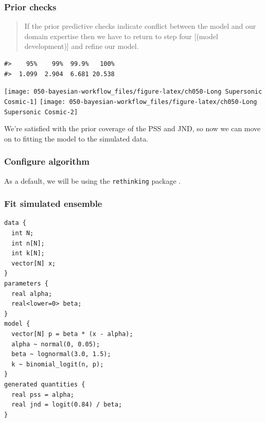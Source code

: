 \documentclass[11pt, oneside, openany]{scrbook}
\begin{document}

\hypertarget{prior-checks}{%
\subsubsection{Prior checks}\label{prior-checks}}

\begin{quote}
If the prior predictive checks indicate conflict between the model and our domain expertise then we have to return to step four {[}(model development){]} and refine our model.
\end{quote}

\begin{verbatim}
#>    95%    99%  99.9%   100% 
#>  1.099  2.904  6.681 20.538
\end{verbatim}

\begin{center}\texttt{[image: 050-bayesian-workflow\_files/figure-latex/ch050-Long Supersonic Cosmic-1]} \texttt{[image: 050-bayesian-workflow\_files/figure-latex/ch050-Long Supersonic Cosmic-2]} \end{center}

We're satisfied with the prior coverage of the PSS and JND, so now we can move on to fitting the model to the simulated data.

\hypertarget{configure-algorithm}{%
\subsubsection{Configure algorithm}\label{configure-algorithm}}

As a default, we will be using the \texttt{rethinking} package \citep{rethinking}.

\hypertarget{fit-simulated-ensemble}{%
\subsubsection{Fit simulated ensemble}\label{fit-simulated-ensemble}}


\begin{verbatim}
data {
  int N;
  int n[N];
  int k[N];
  vector[N] x;
}
parameters {
  real alpha;
  real<lower=0> beta;
}
model {
  vector[N] p = beta * (x - alpha);
  alpha ~ normal(0, 0.05);
  beta ~ lognormal(3.0, 1.5);
  k ~ binomial_logit(n, p);
}
generated quantities {
  real pss = alpha;
  real jnd = logit(0.84) / beta;
}
\end{verbatim}
\end{document}
